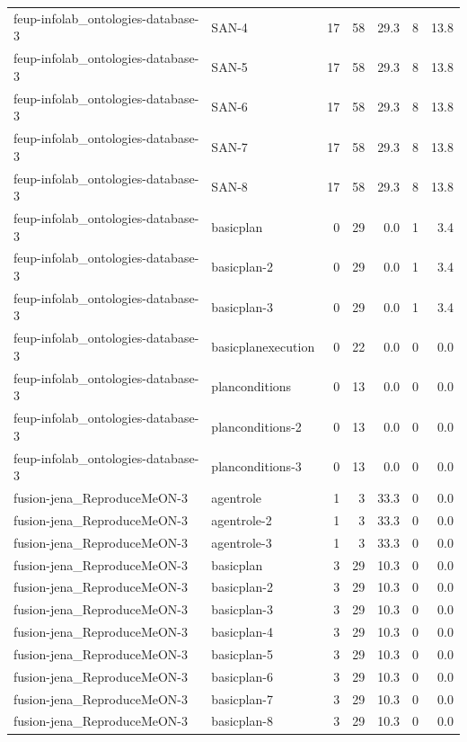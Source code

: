 \begin{tabular}{llrrrrr}
feup-infolab_ontologies-database-3 & SAN-4 & 17 & 58 & 29.3 & 8 & 13.8 \\
feup-infolab_ontologies-database-3 & SAN-5 & 17 & 58 & 29.3 & 8 & 13.8 \\
feup-infolab_ontologies-database-3 & SAN-6 & 17 & 58 & 29.3 & 8 & 13.8 \\
feup-infolab_ontologies-database-3 & SAN-7 & 17 & 58 & 29.3 & 8 & 13.8 \\
feup-infolab_ontologies-database-3 & SAN-8 & 17 & 58 & 29.3 & 8 & 13.8 \\
feup-infolab_ontologies-database-3 & basicplan & 0 & 29 & 0.0 & 1 & 3.4 \\
feup-infolab_ontologies-database-3 & basicplan-2 & 0 & 29 & 0.0 & 1 & 3.4 \\
feup-infolab_ontologies-database-3 & basicplan-3 & 0 & 29 & 0.0 & 1 & 3.4 \\
feup-infolab_ontologies-database-3 & basicplanexecution & 0 & 22 & 0.0 & 0 & 0.0 \\
feup-infolab_ontologies-database-3 & planconditions & 0 & 13 & 0.0 & 0 & 0.0 \\
feup-infolab_ontologies-database-3 & planconditions-2 & 0 & 13 & 0.0 & 0 & 0.0 \\
feup-infolab_ontologies-database-3 & planconditions-3 & 0 & 13 & 0.0 & 0 & 0.0 \\
fusion-jena_ReproduceMeON-3 & agentrole & 1 & 3 & 33.3 & 0 & 0.0 \\
fusion-jena_ReproduceMeON-3 & agentrole-2 & 1 & 3 & 33.3 & 0 & 0.0 \\
fusion-jena_ReproduceMeON-3 & agentrole-3 & 1 & 3 & 33.3 & 0 & 0.0 \\
fusion-jena_ReproduceMeON-3 & basicplan & 3 & 29 & 10.3 & 0 & 0.0 \\
fusion-jena_ReproduceMeON-3 & basicplan-2 & 3 & 29 & 10.3 & 0 & 0.0 \\
fusion-jena_ReproduceMeON-3 & basicplan-3 & 3 & 29 & 10.3 & 0 & 0.0 \\
fusion-jena_ReproduceMeON-3 & basicplan-4 & 3 & 29 & 10.3 & 0 & 0.0 \\
fusion-jena_ReproduceMeON-3 & basicplan-5 & 3 & 29 & 10.3 & 0 & 0.0 \\
fusion-jena_ReproduceMeON-3 & basicplan-6 & 3 & 29 & 10.3 & 0 & 0.0 \\
fusion-jena_ReproduceMeON-3 & basicplan-7 & 3 & 29 & 10.3 & 0 & 0.0 \\
fusion-jena_ReproduceMeON-3 & basicplan-8 & 3 & 29 & 10.3 & 0 & 0.0 \\

\end{tabular}
